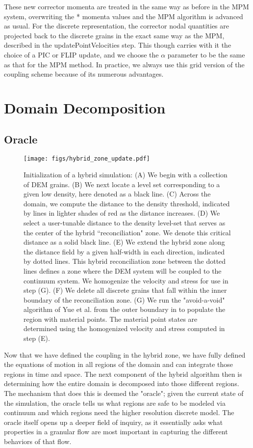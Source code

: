 These new corrector momenta are treated in the same way as before in the MPM system, overwriting the * momenta values and the MPM algorithm is advanced as usual. For the discrete representation, the corrector nodal quantities are projected back to the discrete grains in the exact same way as the MPM, described in the updatePointVelocities step. This though carries with it the choice of a PIC or FLIP update, and we choose the $\alpha$ parameter to be the same as that for the MPM method. In practice, we always use this grid version of the coupling scheme because of its numerous advantages.

\section{Domain Decomposition}

\subsection{Oracle}

\begin{figure}[htp] 
    \centering
    \texttt{[image: figs/hybrid\_zone\_update.pdf]}
    \caption{Initialization of a hybrid simulation: (A) We begin with a collection of DEM grains. (B) We next locate a level
    set corresponding to a given low density, here denoted as a black line. (C) Across the domain, we compute
    the distance to the density threshold, indicated by lines in lighter shades of red as the distance increases.
    (D) We select a user-tunable distance to the density level-set that serves as the center of the hybrid
    ``reconciliation" zone. We denote this critical distance as a solid black line. (E) We extend the hybrid zone
    along the distance field by a given half-width in each direction, indicated by dotted lines. This hybrid
    reconciliation zone between the dotted lines defines a zone where the DEM system will be coupled to the
    continuum system. We homogenize the velocity and stress for use in step (G). (F) We delete all discrete grains that fall within the inner boundary of the reconciliation zone.
    (G) We run the "avoid-a-void" algorithm of Yue et al. \cite{Yue:2015:Continuum} from the outer boundary in to populate the region with material points. The material point states are determined using the homogenized velocity and stress computed in step (E).}
    \label{hybrid_initialization}
\end{figure}
Now that we have defined the coupling in the hybrid zone, we have fully defined the equations of motion in all regions of the domain and can integrate those regions in time and space. The next component of the hybrid algorithm then is determining how the entire domain is decomposed into those different regions. The mechanism that does this is deemed the "oracle"; given the current state of the simulation, the oracle tells us what regions are safe to be modeled via continuum and which regions need the higher resolution discrete model. The oracle itself opens up a deeper field of inquiry, as it essentially asks what properties in a granular flow are most important in capturing the different behaviors of that flow. 

